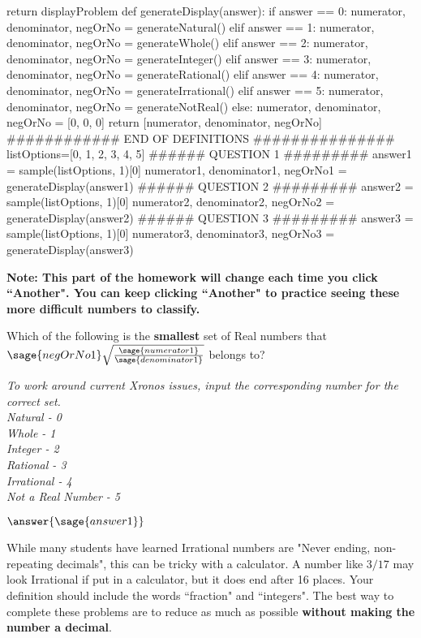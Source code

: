 \documentclass{ximera}
\begin{document}
\begin{sagesilent}
	return displayProblem
def generateDisplay(answer):
	if answer == 0:
	    numerator, denominator, negOrNo = generateNatural()
	elif answer == 1:
	    numerator, denominator, negOrNo = generateWhole()
	elif answer == 2:
	    numerator, denominator, negOrNo = generateInteger()
	elif answer == 3:
	    numerator, denominator, negOrNo = generateRational()
	elif answer == 4:
	    numerator, denominator, negOrNo = generateIrrational()
	elif answer == 5:
	    numerator, denominator, negOrNo = generateNotReal()
	else:
	    numerator, denominator, negOrNo = [0, 0, 0]
	return [numerator, denominator, negOrNo]
############ END OF DEFINITIONS ###############
listOptions=[0, 1, 2, 3, 4, 5]
###### QUESTION 1 #########
answer1 = sample(listOptions, 1)[0]
numerator1, denominator1, negOrNo1 = generateDisplay(answer1)
###### QUESTION 2 #########
answer2 = sample(listOptions, 1)[0]
numerator2, denominator2, negOrNo2 = generateDisplay(answer2)
###### QUESTION 3 #########
answer3 = sample(listOptions, 1)[0]
numerator3, denominator3, negOrNo3 = generateDisplay(answer3)
\end{sagesilent}

\textbf{Note: This part of the homework will change each time you click ``Another". You can keep clicking ``Another" to practice seeing these more difficult numbers to classify.}

\begin{exercise}
Which of the following is the \textbf{smallest} set of Real numbers that $\sage{negOrNo1} \sqrt{ \frac{\sage{numerator1}}{\sage{denominator1}}} $ belongs to?

\textit{To work around current Xronos issues, input the corresponding number for the correct set. \\
Natural - 0 \\
Whole - 1 \\
Integer - 2 \\
Rational - 3 \\
Irrational - 4 \\
Not a Real Number - 5
}

$\answer{\sage{answer1}}$

\begin{hint}
While many students have learned Irrational numbers are "Never ending, non-repeating decimals", this can be tricky with a calculator. A number like $3/17$ may look Irrational if put in a calculator, but it does end after 16 places. Your definition should include the words ``fraction" and ``integers". The best way to complete these problems are to reduce as much as possible \textbf{without making the number a decimal}.
\end{hint}
\end{exercise}
\end{document}
